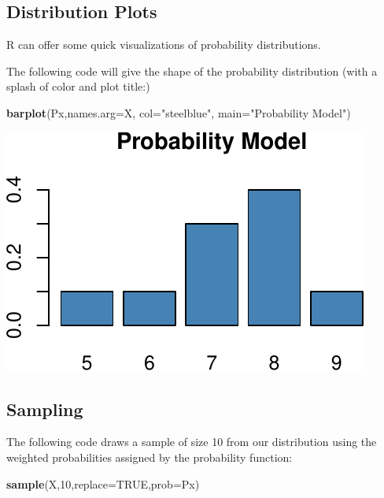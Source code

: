 \documentclass[
]{book}
\newenvironment{Shaded}{\begin{snugshade}}{\end{snugshade}}
\newcommand{\AttributeTok}[1]{\textcolor[rgb]{0.13,0.29,0.53}{#1}}
\newcommand{\ConstantTok}[1]{\textcolor[rgb]{0.56,0.35,0.01}{#1}}
\newcommand{\DecValTok}[1]{\textcolor[rgb]{0.00,0.00,0.81}{#1}}
\newcommand{\FunctionTok}[1]{\textcolor[rgb]{0.13,0.29,0.53}{\textbf{#1}}}
\newcommand{\NormalTok}[1]{#1}
\newcommand{\StringTok}[1]{\textcolor[rgb]{0.31,0.60,0.02}{#1}}
\theoremstyle{definition}
\theoremstyle{definition}
\theoremstyle{definition}
\theoremstyle{definition}
\theoremstyle{remark}
\begin{document}
\subsection*{Distribution Plots}\label{distribution-plots}

R can offer some quick visualizations of probability distributions.

The following code will give the shape of the probability distribution (with a splash of color and plot title:)

\begin{Shaded}
\begin{Highlighting}[]
\FunctionTok{barplot}\NormalTok{(Px,}\AttributeTok{names.arg=}\NormalTok{X, }\AttributeTok{col=}\StringTok{"steelblue"}\NormalTok{, }\AttributeTok{main=}\StringTok{"Probability Model"}\NormalTok{)}
\end{Highlighting}
\end{Shaded}

\includegraphics{math340-notes_files/figure-latex/unnamed-chunk-160-1.pdf}

\subsection*{Sampling}\label{sampling}

The following code draws a sample of size 10 from our distribution using the weighted probabilities assigned by the probability function:

\begin{Shaded}
\begin{Highlighting}[]
\FunctionTok{sample}\NormalTok{(X,}\DecValTok{10}\NormalTok{,}\AttributeTok{replace=}\ConstantTok{TRUE}\NormalTok{,}\AttributeTok{prob=}\NormalTok{Px)}
\end{Highlighting}
\end{Shaded}
\end{document}
